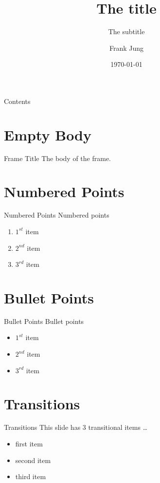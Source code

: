 \documentclass[pdf]{beamer}
\title{The title}
\subtitle{The subtitle}
\author{Frank Jung}
\institute{My Company}
\date{\today}
\begin{document}
\begin{frame}
  \titlepage{}
\end{frame}

\begin{frame}{Contents}
  \tableofcontents{}
\end{frame}

\section{Empty Body}
\begin{frame}{Frame Title}
    The body of the frame.
\end{frame}

\section{Numbered Points}
\begin{frame}{Numbered Points}
  Numbered points
  \begin{enumerate}
    \item{} $1^{st}$ item
    \item{} $2^{nd}$ item
    \item{} $3^{rd}$ item
  \end{enumerate}
\end{frame}

\section{Bullet Points}
\begin{frame}{Bullet Points}
  Bullet points
  \begin{itemize}
    \item{} $1^{st}$ item
    \item{} $2^{nd}$ item
    \item{} $3^{rd}$ item
  \end{itemize}
\end{frame}

\section{Transitions}
\begin{frame}{Transitions}
  This slide has 3 transitional items \ldots
  \pause{}
  \begin{itemize}
    \item{} first item
      \pause{}
    \item{} second item
      \pause{}
    \item{} third item
  \end{itemize}
\end{frame}
\end{document}

